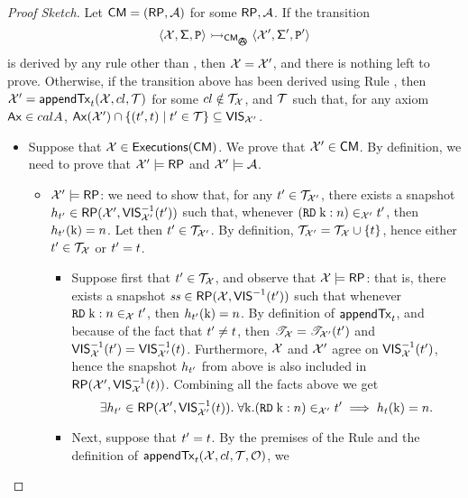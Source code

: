 \begin{proof}[Proof Sketch]
Let $\mathsf{CM} = (\mathsf{RP}, \mathcal{A})$ for some $\mathsf{RP}, \mathcal{A}$.
If the transition 
\[ 
\langle \aexec, \thdstackFun, \prog \rangle \absrightarrow_{\CM_{\anarchicsmall}} 
\langle \aexec', \thdstackFun', \prog' \rangle
\] 
is derived by any rule other than , then $\mathcal{X} = \mathcal{X}'$, and there is nothing 
left to prove. 
Otherwise, if the transition above has been derived using Rule , 
then $\mathcal{X}' = \mathsf{appendTx}_{t}(\mathcal{X}, cl, \mathcal{T})$ for some $cl \notin \mathcal{T}_{\mathcal{X}}$, 
and $\mathcal{T}$ such that, for any axiom $\mathsf{Ax} \in calA$, $\mathsf{Ax}(\mathcal{X}') \cap \{(t', t) \mid t' \in \mathcal{T}\} 
\subseteq {\mathsf{VIS}}_{\mathcal{X}'}$. 
\begin{itemize}
	\item Suppose that $\mathcal{X} \in {\mathsf{Executions}}(\mathsf{CM})$. We prove that $\mathcal{X}' \in \mathsf{CM}$. 
	By definition, we need to prove that $\mathcal{X}' \models \mathsf{RP}$ and $\mathcal{X}' \models \mathcal{A}$.
	\begin{itemize}
		\item  $\mathcal{X}' \models \mathsf{RP}$: we need to show that, for any $t' \in \mathcal{T}_{\mathcal{X}'}$, 
		there exists a snapshot $h_{t'} \in \mathsf{RP}(\mathcal{X}', {\mathsf{VIS}}^{-1}_{\mathcal{X}'}(t'))$ 	
		such that, whenever $({{\tt RD}}\;\mathrm{k}:n) \in_{\mathcal{X}'} t'$, then $h_{t'}(\mathrm{k}) = n$.
		Let then $t' \in \mathcal{T}_{\mathcal{X}'}$. 
		By definition, $\mathcal{T}_{\mathcal{X}'} = \mathcal{T}_{\mathcal{X}} \cup \{ t \}$, hence either 
		$t' \in \mathcal{T}_{\mathcal{X}}$ or $t' = t$. 
		\begin{itemize}
			\item Suppose first that $t' \in \mathcal{T}_{\mathcal{X}}$, 
			and observe that $\mathcal{X} \models \mathsf{RP}$: that is, there exists a snapshot 
			$\mathit{ss} \in \mathsf{RP}(\mathcal{X}, {\mathsf{VIS}}^{-1}(t'))$ such that whenever ${{\tt RD}}\;\mathrm{k}:n \in_{\mathcal{X}} t'$, then 
			$h_{t'}(\mathrm{k}) = n$. By definition of $\mathsf{appendTx}_{t}$, and because of the fact that 
			$t' \neq t$, then  $\mathscr{T}_{\mathcal{X}} = \mathscr{T}_{\mathcal{X}'}(t')$ and 
			${\mathsf{VIS}}_{\mathcal{X}}^{-1}(t') = {\mathsf{VIS}}_{\mathcal{X}'}^{-1}(t)$. 
			Furthermore, $\mathcal{X}$ and $\mathcal{X}'$ agree on ${\mathsf{VIS}}^{-1}_{\mathcal{X}}(t')$, 
			hence the snapshot $h_{t'}$ from above is also included in $\mathsf{RP}(\mathcal{X}', {\mathsf{VIS}}_{\mathcal{X}}^{-1}(t))$. 
			Combining all the facts above we get
			\[
			\exists h_{t'} \in \mathsf{RP}(\mathcal{X}', {\mathsf{VIS}}_{\mathcal{X}'}^{-1}(t)).\; \forall \mathrm{k}. ({{\tt RD}}\;\mathrm{k}: n) \in_{\mathcal{X}'} t' 
			\implies h_{t}(\mathrm{k}) = n.
			\]
			\item Next, suppose that $t' = t$.
			By the premises of the Rule  and the definition of $\mathsf{appendTx}_{t}(\mathcal{X}, cl, \mathcal{T}, \mathcal{O})$, we 

\end{itemize}
\end{itemize}
\end{itemize}
\end{proof}
